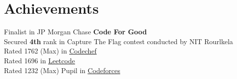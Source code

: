 %
\section{Achievements}
\begin{itemize}[leftmargin=0.15in, label={}]
  \small{\item{
        Finalist in JP Morgan Chase \textbf{Code For Good} \\
        Secured \textbf{4th} rank in Capture The Flag contest conducted by NIT Rourlkela \\
        Rated 1762 (Max) in \href{https://www.codechef.com/users/ashu2909}
        {\underline{Codechef}} \\
        {Rated 1696 in \href{https://leetcode.com/ashu_coderc/}{\underline{Leetcode}}} \\
        Rated 1232 (Max) Pupil in \href{https://codeforces.com/profile/ashucoder}
        {\underline{Codeforces}} \\
        }}


\end{itemize}
